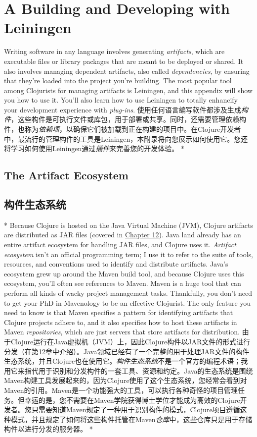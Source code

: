 \documentclass{book}
\begin{document}
\chapter{A Building and Developing with Leiningen}
\begin{paracol}{2}
Writing software in any language involves generating \emph{artifacts},
which are executable files or library packages that are meant to be
deployed or shared. It also involves managing dependent artifacts, also
called \emph{dependencies}, by ensuring that they're loaded into the
project you're building. The most popular tool among Clojurists for
managing artifacts is Leiningen, and this appendix will show you how to
use it. You'll also learn how to use Leiningen to totally enhancify your
development experience with \emph{plug-ins}.
\switchcolumn
使用任何语言编写软件都涉及生成\emph{构件}，这些构件是可执行文件或库包，用于部署或共享。同时，还需要管理依赖构件，也称为\emph{依赖项}，以确保它们被加载到正在构建的项目中。在Clojure开发者中，最流行的管理构件的工具是Leiningen，本附录将向您展示如何使用它。您还将学习如何使用Leiningen通过\emph{插件}来完善您的开发体验。
\switchcolumn[0]*
\section{The Artifact Ecosystem}
\switchcolumn
\section{构件生态系统}
\switchcolumn[0]*
Because Clojure is hosted on the Java Virtual Machine (JVM), Clojure
artifacts are distributed as JAR files (covered in
\href{javascript:void(0)}{Chapter 12}). Java land already has an entire
artifact ecosystem for handling JAR files, and Clojure uses it.
\emph{Artifact ecosystem} isn't an official programming term; I use it
to refer to the suite of tools, resources, and conventions used to
identify and distribute artifacts. Java's ecosystem grew up around the
Maven build tool, and because Clojure uses this ecosystem, you'll often
see references to Maven. Maven is a huge tool that can perform all kinds
of wacky project management tasks. Thankfully, you don't need to get
your PhD in Mavenology to be an effective Clojurist. The only feature
you need to know is that Maven specifies a pattern for identifying
artifacts that Clojure projects adhere to, and it also specifies how to
host these artifacts in Maven \emph{repositories}, which are just
servers that store artifacts for distribution.
\switchcolumn
由于Clojure运行在Java虚拟机（JVM）上，因此Clojure构件以JAR文件的形式进行分发（在第12章中介绍）。Java领域已经有了一个完整的用于处理JAR文件的构件生态系统，并且Clojure也在使用它。\emph{构件生态系统}不是一个官方的编程术语；我用它来指代用于识别和分发构件的一套工具、资源和约定。Java的生态系统是围绕Maven构建工具发展起来的，因为Clojure使用了这个生态系统，您经常会看到对Maven的引用。Maven是一个功能强大的工具，可以执行各种奇怪的项目管理任务。但幸运的是，您不需要在Maven学院获得博士学位才能成为高效的Clojure开发者。您只需要知道Maven规定了一种用于识别构件的模式，Clojure项目遵循这种模式，并且规定了如何将这些构件托管在Maven\emph{仓库}中，这些仓库只是用于存储构件以进行分发的服务器。
\switchcolumn[0]*

\end{paracol}
\end{document}

